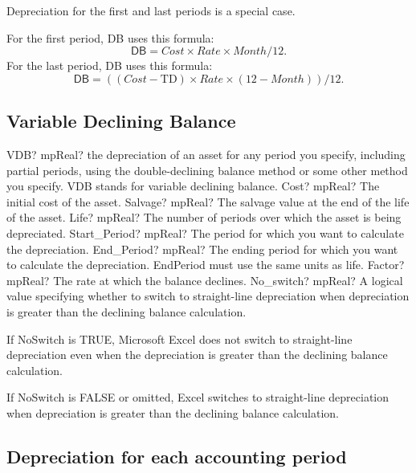 Depreciation for the first and last periods is a special case. 

For the first period, DB uses this formula:
\begin{equation}
	\textsf{DB} = Cost \times Rate \times Month / 12. 
\end{equation}
For the last period, DB uses this formula:
\begin{equation}
	\textsf{DB} = ((Cost - \text{TD}) \times Rate \times (12 - Month)) / 12.
\end{equation}




\subsection{Variable Declining Balance}

\begin{mpFunctionsExtract}
	\mpWorksheetFunctionSevenNotImplemented
	{VDB? mpReal? the depreciation of an asset for any period you specify, including partial periods, using the double-declining balance method or some other method you specify. VDB stands for variable declining balance.}
	{Cost? mpReal?  The initial cost of the asset.}
	{Salvage? mpReal? The salvage value at the end of the life of the asset.}
	{Life? mpReal? The number of periods over which the asset is being depreciated.}
	{Start\_Period? mpReal? The period for which you want to calculate the depreciation.}
	{End\_Period? mpReal? The ending period for which you want to calculate the depreciation. EndPeriod must use the same units as life.}
	{Factor? mpReal? The rate at which the balance declines.}
	{No\_switch? mpReal? A logical value specifying whether to switch to straight-line depreciation when depreciation is greater than the declining balance calculation.}
\end{mpFunctionsExtract}


\vspace{0.3cm}
If NoSwitch is TRUE, Microsoft Excel does not switch to straight-line depreciation even when the depreciation is greater than the declining balance calculation.

If NoSwitch is FALSE or omitted, Excel switches to straight-line depreciation when depreciation is greater than the declining balance calculation.



\subsection{Depreciation for each accounting period}


